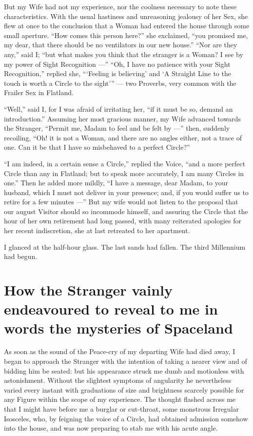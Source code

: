 \documentclass[12pt, a4paper, oneside]{memoir}
\begin{document}
But my Wife had not my experience, nor the coolness necessary to note these
characteristics. With the usual hastiness and unreasoning jealousy of her Sex,
she flew at once to the conclusion that a Woman had entered the house through
some small aperture. ``How comes this person here?'' she exclaimed, ``you
promised me, my dear, that there should be no ventilators in our new house.''
``Nor are they any,'' said I; ``but what makes you think that the stranger is a
Woman? I see by my power of Sight Recognition ---'' ``Oh, I have no patience with
your Sight Recognition,'' replied she, ```Feeling is believing' and `A Straight
Line to the touch is worth a Circle to the sight''' --- two Proverbs, very common
with the Frailer Sex in Flatland.

``Well,'' said I, for I was afraid of irritating her, ``if it must be so, demand
an introduction.'' Assuming her most gracious manner, my Wife advanced towards
the Stranger, ``Permit me, Madam to feel and be felt by ---'' then, suddenly
recoiling, ``Oh! it is not a Woman, and there are no angles either, not a trace
of one. Can it be that I have so misbehaved to a perfect Circle?''

``I am indeed, in a certain sense a Circle,'' replied the Voice, ``and a more
perfect Circle than any in Flatland; but to speak more accurately, I am many
Circles in one.'' Then he added more mildly, ``I have a message, dear Madam, to
your husband, which I must not deliver in your presence; and, if you would
suffer us to retire for a few minutes ---'' But my wife would not listen to the
proposal that our august Visitor should so incommode himself, and assuring the
Circle that the hour of her own retirement had long passed, with many
reiterated apologies for her recent indiscretion, she at last retreated to her
apartment.

I glanced at the half-hour glass. The last sands had fallen. The third
Millennium had begun.





\chapter{How the Stranger vainly endeavoured to reveal to me in words the mysteries of Spaceland}
As soon as the sound of the Peace-cry of my departing Wife had died away, I
began to approach the Stranger with the intention of taking a nearer view and
of bidding him be seated: but his appearance struck me dumb and motionless
with astonishment. Without the slightest symptoms of angularity he
nevertheless varied every instant with graduations of size and brightness
scarcely possible for any Figure within the scope of my experience. The
thought flashed across me that I might have before me a burglar or cut-throat,
some monstrous Irregular Isosceles, who, by feigning the voice of a Circle,
had obtained admission somehow into the house, and was now preparing to stab
me with his acute angle.
\end{document}
